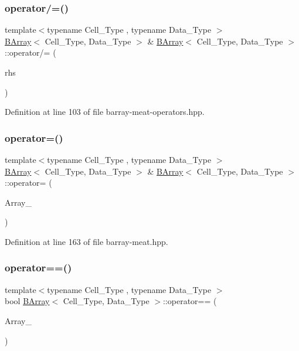 \subsubsection{\texorpdfstring{operator/=()}{operator/=()}}
{\footnotesize\ttfamily template$<$typename Cell\+\_\+\+Type , typename Data\+\_\+\+Type $>$ \\
\hyperlink{class_b_array}{B\+Array}$<$ Cell\+\_\+\+Type, Data\+\_\+\+Type $>$ \& \hyperlink{class_b_array}{B\+Array}$<$ Cell\+\_\+\+Type, Data\+\_\+\+Type $>$\+::operator/= (\begin{DoxyParamCaption}\item[{const Cell\+\_\+\+Type \&}]{rhs }\end{DoxyParamCaption})\hspace{0.3cm}{\ttfamily [inline]}}



Definition at line 103 of file barray-\/meat-\/operators.\+hpp.

\mbox{\label{class_b_array_aa6dba52877c92fa8eafc35faa5f7f304}} 
\subsubsection{\texorpdfstring{operator=()}{operator=()}}
{\footnotesize\ttfamily template$<$typename Cell\+\_\+\+Type , typename Data\+\_\+\+Type $>$ \\
\hyperlink{class_b_array}{B\+Array}$<$ Cell\+\_\+\+Type, Data\+\_\+\+Type $>$ \& \hyperlink{class_b_array}{B\+Array}$<$ Cell\+\_\+\+Type, Data\+\_\+\+Type $>$\+::operator= (\begin{DoxyParamCaption}\item[{const \hyperlink{class_b_array}{B\+Array}$<$ Cell\+\_\+\+Type, Data\+\_\+\+Type $>$ \&}]{Array\+\_\+ }\end{DoxyParamCaption})\hspace{0.3cm}{\ttfamily [inline]}}



Definition at line 163 of file barray-\/meat.\+hpp.

\mbox{\label{class_b_array_a1e6e18162202b06e19f214097eb993bf}} 
\subsubsection{\texorpdfstring{operator==()}{operator==()}}
{\footnotesize\ttfamily template$<$typename Cell\+\_\+\+Type , typename Data\+\_\+\+Type $>$ \\
bool \hyperlink{class_b_array}{B\+Array}$<$ Cell\+\_\+\+Type, Data\+\_\+\+Type $>$\+::operator== (\begin{DoxyParamCaption}\item[{const \hyperlink{class_b_array}{B\+Array}$<$ Cell\+\_\+\+Type, Data\+\_\+\+Type $>$ \&}]{Array\+\_\+ }\end{DoxyParamCaption})\hspace{0.3cm}{\ttfamily [inline]}}



